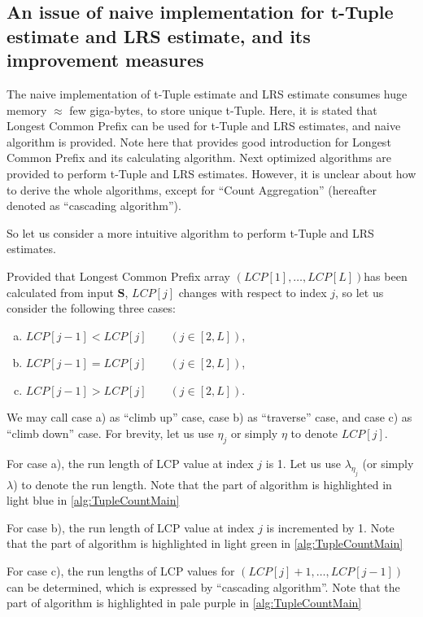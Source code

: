 ﻿\documentclass[a3paper,xelatex,english]{bxjsarticle}
\newcommand\mib[1]{\boldsymbol{#1}}
\begin{document}
\subsection{An issue of naive implementation for t-Tuple estimate and LRS estimate, and its improvement measures}
The naive implementation of t-Tuple estimate and LRS estimate consumes huge memory $\approx$ few giga-bytes, to store unique t-Tuple. 
Here, it is stated that Longest Common Prefix can be used for t-Tuple and LRS estimates, and naive algorithm is provided\cite{Josh}.
Note here that \cite{MIT} provides good introduction for Longest Common Prefix and its calculating algorithm.
Next optimized algorithms are provided to perform t-Tuple and LRS estimates\cite{Kaufer}.
However, it is unclear about how to derive the whole algorithms, except for ``Count Aggregation'' (hereafter denoted as ``cascading algorithm'').

So let us consider a more intuitive algorithm to perform t-Tuple and LRS estimates.

Provided that Longest Common Prefix array $(LCP[1], \ldots, LCP[L]) $has been calculated from input $\mib{S}$, 
$LCP[j]$ changes with respect to index $j$, so let us consider the following three cases: 
\begin{enumerate}[a)]
	\item $LCP[j - 1] < LCP[j] \qquad (j \in [2, L])$,
	\item $LCP[j - 1] = LCP[j] \qquad (j \in [2, L])$,
	\item $LCP[j - 1] > LCP[j] \qquad (j \in [2, L])$.
\end{enumerate}

We may call case a) as ``climb up'' case, case b) as ``traverse'' case, and case c) as ``climb down'' case.
For brevity, let us use $\eta_{j}$ or simply $\eta$ to denote $LCP[j]$.

For case a), the run length of LCP value at index $j$ is 1. Let us use $\lambda_{\eta_{j}}$ (or simply $\lambda$) to denote the run length.
Note that the part of algorithm is highlighted in light blue in \ref{alg:TupleCountMain}

For case b), the run length of LCP value at index $j$ is incremented by 1.
Note that the part of algorithm is highlighted in light green in \ref{alg:TupleCountMain}

For case c), the run lengths of LCP values for $(LCP[j] + 1, \ldots, LCP[j - 1])$ can be determined, which is expressed by ``cascading algorithm''.
Note that the part of algorithm is highlighted in pale purple in \ref{alg:TupleCountMain}
\end{document}
